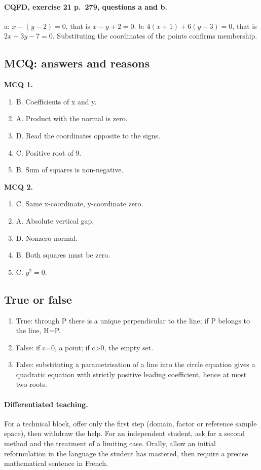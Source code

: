 \paragraph{CQFD, exercise 21 p.~279, questions a and b.} a: $x-(y-2)=0$, that is $x-y+2=0$. b: $4(x+1)+6(y-3)=0$, that is $2x+3y-7=0$. Substituting the coordinates of the points confirms membership.
\subsection*{MCQ: answers and reasons}
\textbf{MCQ 1.}
\begin{enumerate}
\item B. Coefficients of x and y.
\item A. Product with the normal is zero.
\item D. Read the coordinates opposite to the signs.
\item C. Positive root of 9.
\item B. Sum of squares is non-negative.
\end{enumerate}
\textbf{MCQ 2.}
\begin{enumerate}
\item C. Same x-coordinate, y-coordinate zero.
\item A. Absolute vertical gap.
\item D. Nonzero normal.
\item B. Both squares must be zero.
\item C. $y^2=0$.
\end{enumerate}
\subsection*{True or false}
\begin{enumerate}
\item True: through P there is a unique perpendicular to the line; if P belongs to the line, H=P.
\item False: if c=0, a point; if c>0, the empty set.
\item False: substituting a parametrisation of a line into the circle equation gives a quadratic equation with strictly positive leading coefficient, hence at most two roots.
\end{enumerate}
\paragraph{Differentiated teaching.} For a technical block, offer only the first step (domain, factor or reference sample space), then withdraw the help. For an independent student, ask for a second method and the treatment of a limiting case. Orally, allow an initial reformulation in the language the student has mastered, then require a precise mathematical sentence in French.
